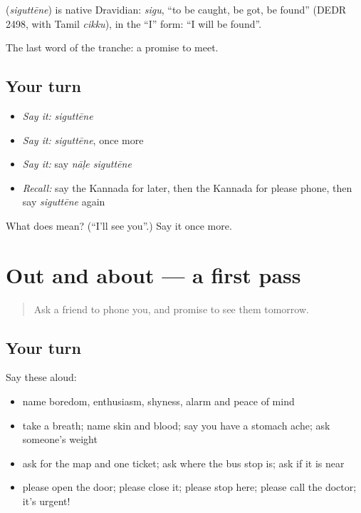 \begin{cousinweb}
\textbf{} (\emph{siguttēne}) is native Dravidian: \emph{sigu}, \textquotedblleft{}to be caught, be got, be found\textquotedblright{} (DEDR 2498, with Tamil \emph{cikku}), in the \textquotedblleft{}I\textquotedblright{} form: \textquotedblleft{}I will be found\textquotedblright{}.
\end{cousinweb}

\begin{grammarlens}[title={What you've built}]
The last word of the tranche: a promise to meet.
\end{grammarlens}

\subsection*{Your turn}
\begin{itemize}
\raggedright
  \item \emph{Say it:} \emph{siguttēne}
  \item \emph{Say it:} \emph{siguttēne}, once more
  \item \emph{Say it:} say \emph{nāḷe siguttēne}
  \item \emph{Recall:} say the Kannada for later, then the Kannada for please phone, then say \emph{siguttēne} again
\end{itemize}

\begin{tcolorbox}[breakable,colback=teal!4,colframe=teal!35!black,title={Before you move on}]
What does  mean? (\textquotedblleft{}I'll see you\textquotedblright{}.) Say it once more.
\end{tcolorbox}
\section[(dialogue)]{Out and about — a first pass}

\label{lesson:KA-R106-first-pass-moods-body-find}



\begin{quote}
Ask a friend to phone you, and promise to see them tomorrow.
\end{quote}

\subsection*{Your turn}
Say these aloud:

\begin{itemize}
\raggedright
  \item name boredom, enthusiasm, shyness, alarm and peace of mind
  \item take a breath; name skin and blood; say you have a stomach ache; ask someone's weight
  \item ask for the map and one ticket; ask where the bus stop is; ask if it is near
  \item please open the door; please close it; please stop here; please call the doctor; it's urgent!
\end{itemize}

